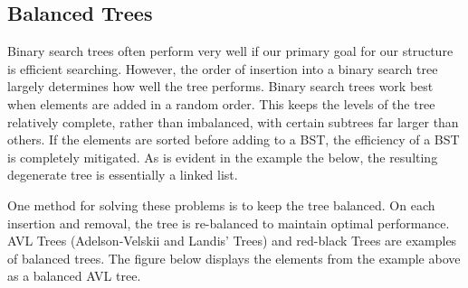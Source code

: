 \subsection*{Balanced Trees}
Binary search trees often perform very well if our primary goal for our structure is efficient searching.
However, the order of insertion into a binary search tree largely determines how well the tree performs.
Binary search trees work best when elements are added in a random order.
This keeps the levels of the tree relatively complete, rather than imbalanced, with certain subtrees far larger than others.
If the elements are sorted before adding to a BST, the efficiency of a BST is completely mitigated.
As is evident in the example the below, the resulting degenerate tree is essentially a linked list.
\begin{center}
\end{center}
\begin{center}
\end{center}

One method for solving these problems is to keep the tree balanced.
On each insertion and removal, the tree is re-balanced to maintain optimal performance.
AVL Trees (Adelson-Velskii and Landis' Trees) and red-black Trees are examples of balanced trees.
 The figure below displays the elements from the example above as a balanced AVL tree.

\begin{center}
\end{center}
\begin{center}
\end{center}


